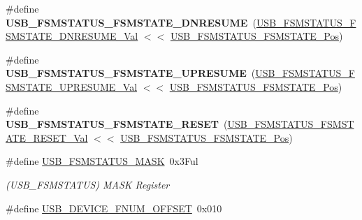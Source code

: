 \begin{DoxyCompactItemize}
\item 
\hypertarget{group___s_a_m_l21___u_s_b_ga48a4a0deab1619732611080cfc91cdd3}{}\#define {\bfseries U\+S\+B\+\_\+\+F\+S\+M\+S\+T\+A\+T\+U\+S\+\_\+\+F\+S\+M\+S\+T\+A\+T\+E\+\_\+\+D\+N\+R\+E\+S\+U\+M\+E}~(\hyperlink{group___s_a_m_l21___u_s_b_ga59b7422057d8f9794ebb827253bdd939}{U\+S\+B\+\_\+\+F\+S\+M\+S\+T\+A\+T\+U\+S\+\_\+\+F\+S\+M\+S\+T\+A\+T\+E\+\_\+\+D\+N\+R\+E\+S\+U\+M\+E\+\_\+\+Val} $<$$<$ \hyperlink{group___s_a_m_l21___u_s_b_ga1584eb0083050e0e37701f538d71c143}{U\+S\+B\+\_\+\+F\+S\+M\+S\+T\+A\+T\+U\+S\+\_\+\+F\+S\+M\+S\+T\+A\+T\+E\+\_\+\+Pos})\label{group___s_a_m_l21___u_s_b_ga48a4a0deab1619732611080cfc91cdd3}

\item 
\hypertarget{group___s_a_m_l21___u_s_b_gae97ab89e179f567750bca0887fb1338a}{}\#define {\bfseries U\+S\+B\+\_\+\+F\+S\+M\+S\+T\+A\+T\+U\+S\+\_\+\+F\+S\+M\+S\+T\+A\+T\+E\+\_\+\+U\+P\+R\+E\+S\+U\+M\+E}~(\hyperlink{group___s_a_m_l21___u_s_b_ga6c9420acb01f1143c26eb341646bdfd4}{U\+S\+B\+\_\+\+F\+S\+M\+S\+T\+A\+T\+U\+S\+\_\+\+F\+S\+M\+S\+T\+A\+T\+E\+\_\+\+U\+P\+R\+E\+S\+U\+M\+E\+\_\+\+Val} $<$$<$ \hyperlink{group___s_a_m_l21___u_s_b_ga1584eb0083050e0e37701f538d71c143}{U\+S\+B\+\_\+\+F\+S\+M\+S\+T\+A\+T\+U\+S\+\_\+\+F\+S\+M\+S\+T\+A\+T\+E\+\_\+\+Pos})\label{group___s_a_m_l21___u_s_b_gae97ab89e179f567750bca0887fb1338a}

\item 
\hypertarget{group___s_a_m_l21___u_s_b_ga26cbe4407b5bc1b6ee97e37f92b1c45e}{}\#define {\bfseries U\+S\+B\+\_\+\+F\+S\+M\+S\+T\+A\+T\+U\+S\+\_\+\+F\+S\+M\+S\+T\+A\+T\+E\+\_\+\+R\+E\+S\+E\+T}~(\hyperlink{group___s_a_m_l21___u_s_b_ga2b6360b48e2e09457988f60d8152f203}{U\+S\+B\+\_\+\+F\+S\+M\+S\+T\+A\+T\+U\+S\+\_\+\+F\+S\+M\+S\+T\+A\+T\+E\+\_\+\+R\+E\+S\+E\+T\+\_\+\+Val} $<$$<$ \hyperlink{group___s_a_m_l21___u_s_b_ga1584eb0083050e0e37701f538d71c143}{U\+S\+B\+\_\+\+F\+S\+M\+S\+T\+A\+T\+U\+S\+\_\+\+F\+S\+M\+S\+T\+A\+T\+E\+\_\+\+Pos})\label{group___s_a_m_l21___u_s_b_ga26cbe4407b5bc1b6ee97e37f92b1c45e}

\item 
\hypertarget{group___s_a_m_l21___u_s_b_ga3e8c235aa7899f43a386e292dc032763}{}\#define \hyperlink{group___s_a_m_l21___u_s_b_ga3e8c235aa7899f43a386e292dc032763}{U\+S\+B\+\_\+\+F\+S\+M\+S\+T\+A\+T\+U\+S\+\_\+\+M\+A\+S\+K}~0x3\+Ful\label{group___s_a_m_l21___u_s_b_ga3e8c235aa7899f43a386e292dc032763}

\begin{DoxyCompactList}\small\item\em (U\+S\+B\+\_\+\+F\+S\+M\+S\+T\+A\+T\+U\+S) M\+A\+S\+K Register \end{DoxyCompactList}\item 
\hypertarget{group___s_a_m_l21___u_s_b_ga04c4c55b4b6a088cb4ec0b8ab8e5c3ef}{}\#define \hyperlink{group___s_a_m_l21___u_s_b_ga04c4c55b4b6a088cb4ec0b8ab8e5c3ef}{U\+S\+B\+\_\+\+D\+E\+V\+I\+C\+E\+\_\+\+F\+N\+U\+M\+\_\+\+O\+F\+F\+S\+E\+T}~0x010\label{group___s_a_m_l21___u_s_b_ga04c4c55b4b6a088cb4ec0b8ab8e5c3ef}


\end{DoxyCompactItemize}
